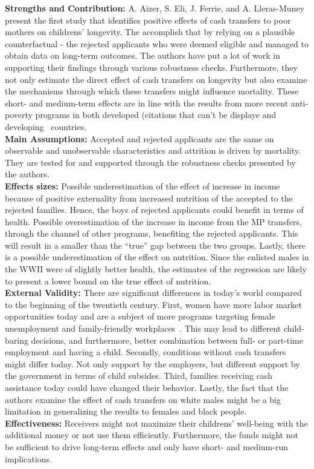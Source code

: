 \textbf{Strengths and Contribution:} A. Aizer, S. Eli, J. Ferrie, and A. Lleras-Muney present the first study that identifies positive effects of cash transfers to poor mothers on childrens' longevity. The accomplish that by relying on a plausible counterfactual - the rejected applicants who were deemed eligible and managed to obtain data on long-term outcomes. The authors have put a lot of work in supporting their findings through various robustness checks. Furthermore, they not only estimate the direct effect of cash transfers on longevity but also examine the mechanisms through which these transfers might influence mortality. These short- and medium-term effects are in line with the results from more recent anti-poverty programs in both developed (citations that can't be displaye and developing~\citep{barham2011healthier, barham2013living} countries.\\
\textbf{Main Assumptions:} Accepted and rejected applicants are the same on observable and unobservable characteristics and attrition is driven by mortality. They are tested for and supported through the robustness checks presented by the authors.   \\
\textbf{Effects sizes:} Possible underestimation of the effect of increase in income because of positive
externality from increased nutrition of the accepted to the rejected families. Hence, the boys of rejected applicants could benefit in terms of health. Possible overestimation of the increase in income from the MP transfers, through the channel of other programs, benefiting the rejected applicants. This will result in a smaller than the ``true'' gap between the two groups. Lastly, there is a possible underestimation of the effect on nutrition. Since the enlisted males in the WWII were of slightly better health, the estimates of the regression are likely to present a lower bound on the true effect of nutrition. \\
\textbf{External Validity:} There are significant differences in today's world compared to the beginning of the twentieth century. First, women have more labor market opportunities today and are a subject of more programs targeting female unemployment and family-friendly workplaces~\citep{lauber2016helping}. This may lead to different child-baring decisions, and furthermore, better combination between full- or part-time employment and having a child. Secondly, conditions without cash transfers might differ today. Not only support by the employers, but different support by the government in terms of child subsides. Third, families receiving cash assistance today could have changed their behavior. Lastly, the fact that the authors examine the effect of cash transfers on white males might be a big limitation in generalizing the results to females and black people.\\   
\textbf{Effectiveness:} Receivers might not maximize their childrens' well-being with the additional money or not use them efficiently. Furthermore, the funds might not be sufficient to drive long-term effects and only have short- and medium-run implications. 